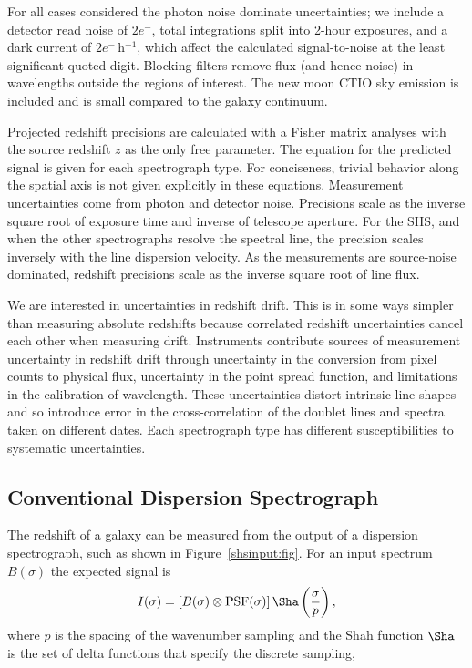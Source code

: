 \documentclass[preprint2, 10pt]{aastex}
\begin{document}
{For all cases considered the photon noise dominate uncertainties;
we include a detector read noise of $2e^-$, total integrations split into 2-hour exposures, and a dark current of $2e^-$\,h$^{-1}$,
which affect the calculated signal-to-noise at the least significant quoted digit.
Blocking filters remove flux (and hence noise) in wavelengths outside the regions
of interest.  The new moon CTIO sky emission is included and
is small compared to the galaxy continuum.


Projected redshift precisions are calculated with a Fisher matrix
analyses with the source redshift $z$ as the only free parameter.  The
equation for the predicted signal is given for each spectrograph type.
For conciseness, trivial behavior along the spatial axis is not given
explicitly in these equations.  Measurement uncertainties come from
photon and detector noise.
Precisions scale as the inverse square root of exposure time and inverse of telescope aperture. 
For the SHS, and when the other spectrographs resolve the spectral line, the precision scales 
inversely 
with the line dispersion velocity.  
As the measurements
are source-noise dominated, redshift precisions scale as the inverse square 
root
of line flux. 


We are interested in uncertainties in redshift drift.
This is in some ways simpler than measuring absolute redshifts
because correlated redshift uncertainties cancel each other when measuring drift.
Instruments contribute sources of measurement uncertainty in redshift drift through 
uncertainty in the conversion from pixel counts to physical flux, uncertainty in the point spread function,
and limitations in the calibration
of wavelength.   These uncertainties distort intrinsic line shapes and so introduce error in the cross-correlation
of the doublet lines and spectra taken on different dates. 
Each spectrograph type
has different susceptibilities to systematic uncertainties.


\subsection{Conventional Dispersion Spectrograph} \label{sec:dispspec} 

The redshift of a galaxy can be measured from the output of a dispersion spectrograph, such as shown in Figure~\ref{shsinput:fig}.
For an input spectrum $B(\sigma)$ the expected signal is
\begin{equation}
I(\sigma) = \left[B(\sigma)\otimes \mbox{PSF}(\sigma)\right]\Sha\left(\frac{\sigma}{p}\right),
\label{conventional:eqn}
\end{equation}
where $p$ is the spacing of the wavenumber sampling and the Shah function $\Sha$ is the set of delta functions
that specify the discrete sampling,

}
\end{document}
